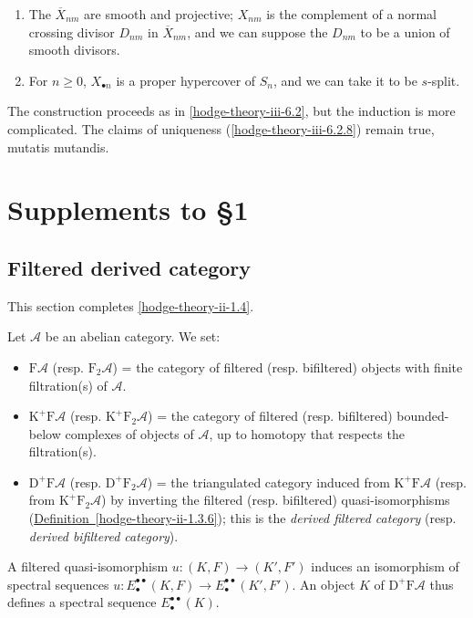     
 \begin{enumerate}
      
 \item[(a)]
        The \(\overline {X}_{nm}\) are smooth and projective;
        \(X_{nm}\) is the complement of a normal crossing divisor \(D_{nm}\) in \(\overline {X}_{nm}\), and we can suppose the \(D_{nm}\) to be a union of smooth divisors.
      


      
 \item[(b)]
        For \(n\geqslant 0\), \(X_{\bullet  n}\) is a proper hypercover of \(S_n\), and we can take it to be \(s\)-split.
      

    \end{enumerate}\par{}The construction proceeds as in \cref{hodge-theory-iii-6.2}, but the induction is more complicated.
    The claims of uniqueness (\cref{hodge-theory-iii-6.2.8}) remain true, mutatis mutandis.\chapter{Supplements to §1}\thispagestyle{fancy}\label{hodge-theory-iii-7}\section{Filtered derived category}\label{hodge-theory-iii-7.1}\par{}This section completes \cref{hodge-theory-ii-1.4}.\label{hodge-theory-iii-7.1.1}\par{}Let \(\mathscr {A}\) be an abelian category.
    We set:

    \begin{itemize}\item{}\(\mathrm {F}\mathscr {A}\) (resp. \(\mathrm {F}_2\mathscr {A}\))
        = the category of filtered (resp. bifiltered) objects with finite filtration(s) of \(\mathscr {A}\).
      \item{}\(\mathrm {K}^+\mathrm {F}\mathscr {A}\) (resp. \(\mathrm {K}^+\mathrm {F}_2\mathscr {A}\))
        = the category of filtered (resp. bifiltered) bounded-below complexes of objects of \(\mathscr {A}\), up to homotopy that respects the filtration(s).
      \item{}\(\mathrm {D}^+\mathrm {F}\mathscr {A}\) (resp. \(\mathrm {D}^+\mathrm {F}_2\mathscr {A}\))
        = the triangulated category induced from \(\mathrm {K}^+\mathrm {F}\mathscr {A}\) (resp. from \(\mathrm {K}^+\mathrm {F}_2\mathscr {A}\)) by inverting the filtered (resp. bifiltered) quasi-isomorphisms (\hyperref[hodge-theory-ii-1.3.6]{Definition~\ref*{hodge-theory-ii-1.3.6}});
        this is the \emph{derived filtered category} (resp. \emph{derived bifiltered category}).\end{itemize}\label{hodge-theory-iii-7.1.2}\par{}A filtered quasi-isomorphism \(u\colon (K,F)\to (K',F')\) induces an isomorphism of spectral sequences \(u\colon  E_\bullet ^{\bullet \bullet }(K,F)\to  E_\bullet ^{\bullet \bullet }(K',F')\).
    An object \(K\) of \(\mathrm {D}^+\mathrm {F}\mathscr {A}\) thus defines a spectral sequence \(E_\bullet ^{\bullet \bullet }(K)\).
    
